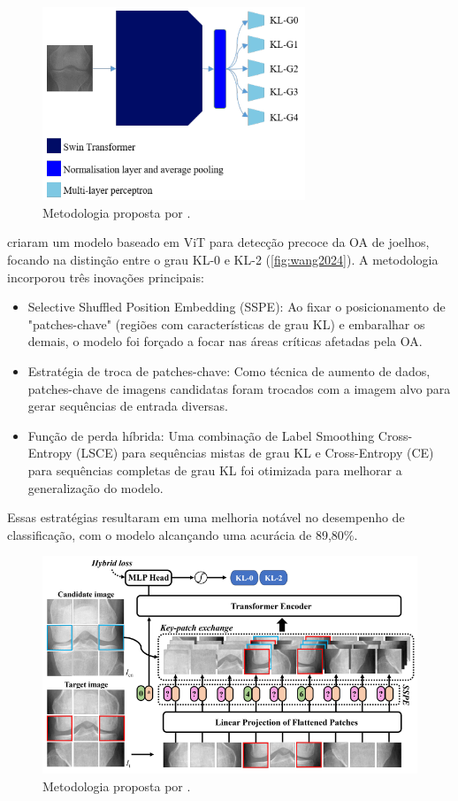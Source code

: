 \begin{figure}[ht]
    \centering
    \includegraphics[width=0.7\textwidth]{figs/sekhri2023.png}
    \caption{Metodologia proposta por \cite{sekhri2023}.}
    \label{fig:sekhri2023}
\end{figure}

\cite{Wang_2024} criaram um modelo baseado em ViT para detecção precoce da OA de joelhos, focando na distinção entre o grau KL-0 e KL-2 (\autoref{fig:wang2024}). A metodologia incorporou três inovações principais:

\begin{itemize}
    \item Selective Shuffled Position Embedding (SSPE): Ao fixar o posicionamento de "patches-chave" (regiões com características de grau KL) e embaralhar os demais, o modelo foi forçado a focar nas áreas críticas afetadas pela OA.
    \item Estratégia de troca de patches-chave: Como técnica de aumento de dados, patches-chave de imagens candidatas foram trocados com a imagem alvo para gerar sequências de entrada diversas.
    \item Função de perda híbrida: Uma combinação de Label Smoothing Cross-Entropy (LSCE) para sequências mistas de grau KL e Cross-Entropy (CE) para sequências completas de grau KL foi otimizada para melhorar a generalização do modelo.
\end{itemize}

Essas estratégias resultaram em uma melhoria notável no desempenho de classificação, com o modelo alcançando uma acurácia de 89,80\%.

\begin{figure}[ht]
    \centering
    \includegraphics[width=\textwidth]{figs/wang2024.png}
    \caption{Metodologia proposta por \cite{Wang_2024}.}
    \label{fig:wang2024}
\end{figure}

